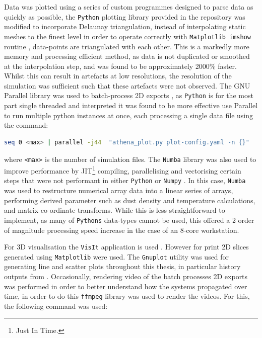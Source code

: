 Data was plotted using a series of custom programmes designed to parse data as quickly as possible, 
the \texttt{Python} plotting library provided in the \athena{} repository was modified to incorporate Delaunay triangulation, instead of interpolating static meshes to the finest level in order to operate correctly with \texttt{Matplotlib imshow} routine \parencite{Hunter:2007}, data-points are triangulated with each other.
This is a markedly more memory and processing efficient method, as data is not duplicated or smoothed at the interpolation step, and was found to be approximately 2000\% faster.
Whilst this can result in artefacts at low resolutions, the resolution of the simulation was sufficient such that these artefacts were not observed.
The GNU Parallel library was used to batch-process 2D exports \parencite{tange_2021_5523272}, as \texttt{Python} is for the most part single threaded and interpreted it was found to be more effective use Parallel to run multiple python instances at once, each processing a single data file using the command:

\begin{lstlisting}[language=bash]
seq 0 <max> | parallel -j44  "athena_plot.py plot-config.yaml -n {}"
\end{lstlisting}

\noindent
where \texttt{<max>} is the number of simulation files.
The \texttt{Numba} library \parencite{lam2015numba} was also used to improve performance by  JIT\footnote{Just In Time.} compiling, parallelising and vectorising certain steps that were not performant in either \texttt{Python} or \texttt{Numpy} \parencite{harris2020array}.
In this case, \texttt{Numba} was used to restructure numerical array data into a linear series of arrays, performing derived parameter such as dust density and temperature calculations, and matrix co-ordinate transforms.
While this is less straightforward to implement, as many of \texttt{Pythons} data-types cannot be used, this offered a 2 order of magnitude processing speed increase in the case of an 8-core workstation.

For 3D visualisation the \texttt{VisIt} application is used \parencite{HPV:VisIt}.
However for print 2D slices generated using \texttt{Matplotlib} were used. 
The \texttt{Gnuplot} utility \parencite{gnuplot} was used for generating line and scatter plots throughout this thesis, in particular history outputs from \athena{}.
Occasionally, rendering video of the batch processes 2D exports was performed in order to better understand how the systems propagated over time, in order to do this \texttt{ffmpeg} library \parencite{tomar2006converting} was used to render the videos.
For this, the following command was used:

